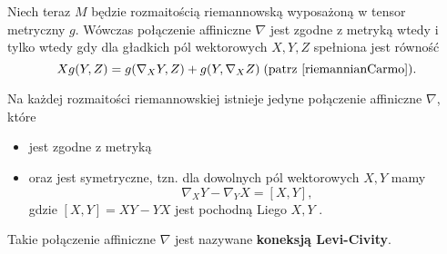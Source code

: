 Niech teraz $M$ będzie rozmaitością riemannowską wyposażoną w tensor metryczny $g$. Wówczas połączenie affiniczne $\nabla$ jest zgodne z metryką wtedy i tylko wtedy gdy dla gładkich pól wektorowych $X,Y,Z$ spełniona jest równość
$$Xg(Y, Z)=g(\nabla_XY, Z)+g(Y, \nabla_XZ)\; (\text{patrz \cite{riemannianCarmo}}).$$

Na każdej rozmaitości riemannowskiej istnieje jedyne połączenie affiniczne $\nabla$, które 
\begin{itemize}
  \item jest zgodne z metryką
  \item oraz jest symetryczne, tzn. dla dowolnych pól wektorowych $X, Y$ mamy 
    $$\nabla_X Y-\nabla_Y X=[X, Y],$$ 
    gdzie $[X, Y]=XY-YX$ jest pochodną Liego $X, Y$ \cite{riemannianCarmo}.
\end{itemize}
Takie połączenie affiniczne $\nabla$ jest nazywane \textbf{koneksją Levi-Civity}.

